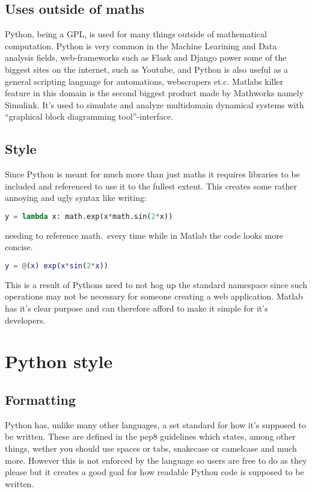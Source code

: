 \documentclass{article}
\begin{document}
\subsection{Uses outside of maths}
Python, being a GPL, is used for many things outside of mathematical computation. Python is very common in the Machine Learining and Data
analysis fields, web-frameworks such as Flask and Django power some of the biggest sites on the internet, such as Youtube, and Python is
also useful as a general scripting language for automations, webscrapers et.c. Matlabs killer feature in this domain is the second
biggest product made by Mathworks namely Simulink. It's used to simulate and analyze multidomain dynamical systems with ``graphical block diagramming tool''-interface.

\subsection{Style}
Since Python is meant for much more than just maths it requires libraries to be included and referenced to use it to the fullest extent.
This creates some rather annoying and ugly syntax like writing:
\begin{lstlisting}[language=Python]
y = lambda x: math.exp(x*math.sin(2*x))
\end{lstlisting}
needing to reference math.\ every time while in Matlab the code looks more concise.
\begin{lstlisting}[language=Matlab]
y = @(x) exp(x*sin(2*x))
\end{lstlisting}
This is a result of Pythons need to not hog up the standard namespace since such operations may not be necessary for someone creating a
web application. Matlab has it's clear purpose and can therefore afford to make it simple for it's developers.



\section{Python style}%
\subsection{Formatting}
Python has, unlike many other languages, a set standard for how it's supposed to be written. These are defined in the pep8 guidelines
which states, among other things, wether you should use spaces or tabs, snakecase or camelcase and much more. However this is not
enforced by the language so users are free to do as they please but it creates a good goal for how readable Python code is supposed to
be written.
\end{document}
